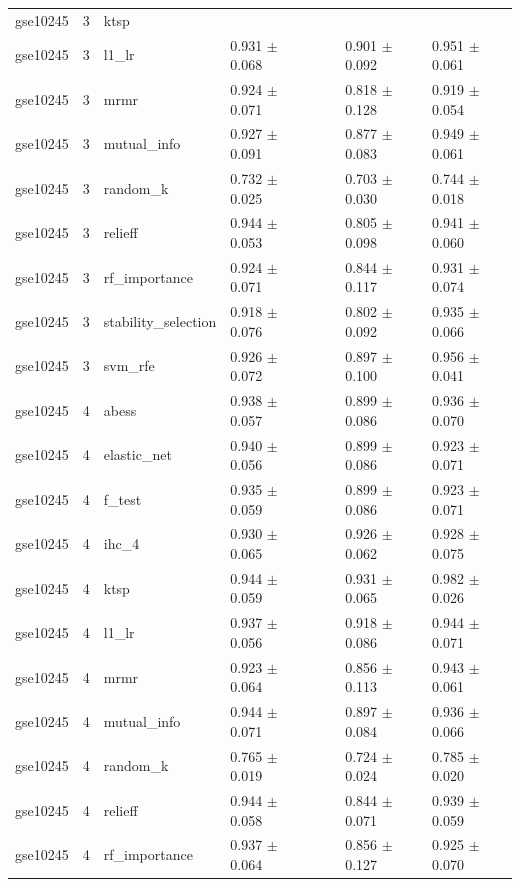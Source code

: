 \begin{table}[t]
\begin{tabular}{llllllll}
    gse10245 & 3 & ktsp &  &  &  &  &  \\
    gse10245 & 3 & l1\_lr & 0.931 $\pm$ 0.068 &  &  & 0.901 $\pm$ 0.092 & 0.951 $\pm$ 0.061 \\
    gse10245 & 3 & mrmr & 0.924 $\pm$ 0.071 &  &  & 0.818 $\pm$ 0.128 & 0.919 $\pm$ 0.054 \\
    gse10245 & 3 & mutual\_info & 0.927 $\pm$ 0.091 &  &  & 0.877 $\pm$ 0.083 & 0.949 $\pm$ 0.061 \\
    gse10245 & 3 & random\_k & 0.732 $\pm$ 0.025 &  &  & 0.703 $\pm$ 0.030 & 0.744 $\pm$ 0.018 \\
    gse10245 & 3 & relieff & 0.944 $\pm$ 0.053 &  &  & 0.805 $\pm$ 0.098 & 0.941 $\pm$ 0.060 \\
    gse10245 & 3 & rf\_importance & 0.924 $\pm$ 0.071 &  &  & 0.844 $\pm$ 0.117 & 0.931 $\pm$ 0.074 \\
    gse10245 & 3 & stability\_selection & 0.918 $\pm$ 0.076 &  &  & 0.802 $\pm$ 0.092 & 0.935 $\pm$ 0.066 \\
    gse10245 & 3 & svm\_rfe & 0.926 $\pm$ 0.072 &  &  & 0.897 $\pm$ 0.100 & 0.956 $\pm$ 0.041 \\
    gse10245 & 4 & abess & 0.938 $\pm$ 0.057 &  &  & 0.899 $\pm$ 0.086 & 0.936 $\pm$ 0.070 \\
    gse10245 & 4 & elastic\_net & 0.940 $\pm$ 0.056 &  &  & 0.899 $\pm$ 0.086 & 0.923 $\pm$ 0.071 \\
    gse10245 & 4 & f\_test & 0.935 $\pm$ 0.059 &  &  & 0.899 $\pm$ 0.086 & 0.923 $\pm$ 0.071 \\
    gse10245 & 4 & ihc\_4 & 0.930 $\pm$ 0.065 &  &  & 0.926 $\pm$ 0.062 & 0.928 $\pm$ 0.075 \\
    gse10245 & 4 & ktsp & 0.944 $\pm$ 0.059 &  &  & 0.931 $\pm$ 0.065 & 0.982 $\pm$ 0.026 \\
    gse10245 & 4 & l1\_lr & 0.937 $\pm$ 0.056 &  &  & 0.918 $\pm$ 0.086 & 0.944 $\pm$ 0.071 \\
    gse10245 & 4 & mrmr & 0.923 $\pm$ 0.064 &  &  & 0.856 $\pm$ 0.113 & 0.943 $\pm$ 0.061 \\
    gse10245 & 4 & mutual\_info & 0.944 $\pm$ 0.071 &  &  & 0.897 $\pm$ 0.084 & 0.936 $\pm$ 0.066 \\
    gse10245 & 4 & random\_k & 0.765 $\pm$ 0.019 &  &  & 0.724 $\pm$ 0.024 & 0.785 $\pm$ 0.020 \\
    gse10245 & 4 & relieff & 0.944 $\pm$ 0.058 &  &  & 0.844 $\pm$ 0.071 & 0.939 $\pm$ 0.059 \\
    gse10245 & 4 & rf\_importance & 0.937 $\pm$ 0.064 &  &  & 0.856 $\pm$ 0.127 & 0.925 $\pm$ 0.070 \\

\end{tabular}
\end{table}
